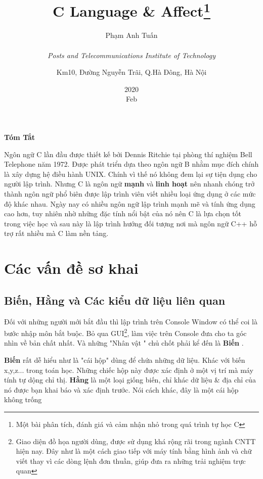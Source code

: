 \documentclass[12pt,a4paper]{article}
\title{\textbf{C Language \& Affect}\thanks{Một bài phân tích, đánh giá và cảm nhận nhỏ trong quá trình tự học C}}
\date{2020\\ Feb}
\author{Phạm Anh Tuấn\\ \\ \textit{Posts and Telecommunications Institute of Technology} \and Km10, Đường Nguyễn Trãi, Q.Hà Đông, Hà Nội}
\begin{document}
\maketitle
\begin{center}
	\textbf{\large Tóm Tắt}
\end{center}


Ngôn ngữ C lần đầu được thiết kế bởi Dennis Ritchie tại phòng thí nghiệm Bell Telephone năm 1972. Được phát triển dựa theo ngôn ngữ B nhằm mục đích chính là xây dựng hệ điều hành UNIX. Chính vì thế nó không đem lại sự tiện dụng cho người lập trình. Nhưng C là ngôn ngữ \textbf{mạnh} và \textbf{linh hoạt} nên nhanh chóng trở thành ngôn ngữ phổ biên được lập trình viên viết nhiều loại ứng dụng ở các mức độ khác nhau. Ngày nay có nhiều ngôn ngữ lập trình mạnh mẽ và tính ứng dụng cao hơn, tuy nhiên nhờ những đặc tính nổi bật của nó nên C là lựa chọn tốt trong việc học và sau này là lập trình hướng đối tượng nơi mà ngôn ngữ C++ hỗ trợ rất nhiều mà C làm nền tảng.
\newpage
\section{Các vấn đề sơ khai}
\subsection{Biến, Hằng và Các kiểu dữ liệu liên quan }
 Đối với những người mới bắt đầu thì lập trình trên Console Window có thể coi là bước nhập môn bắt buộc. Bỏ qua GUI\footnote{Giao diện đồ họa người dùng, được sử dụng khá rộng rãi trong ngành CNTT hiện nay. Đây như là một cách giao tiếp với máy tính bằng hình ảnh và chữ viết thay vì các dòng lệnh đơn thuần, giúp đưa ra những trải nghiệm trực quan}, làm việc trên Console đưa cho ta góc nhìn về bản chất nhất. Và những "Nhân vật " chủ chốt phải kể đến là \textbf{Biến} . 

\textbf{Biến} rất dễ hiểu như là "cái hộp" dùng để chứa những dữ liệu. Khác với biến x,y,z... trong toán học. Những chiếc hộp này được xác định ở một vị trí mà máy tính tự dộng chỉ thị. \textbf{Hằng} là một loại giống biến, chỉ khác dữ liệu \& địa chỉ của nó được bạn khai báo và xác định trước. Nói cách khác, đây là một cái hộp không trống
\end{document}
